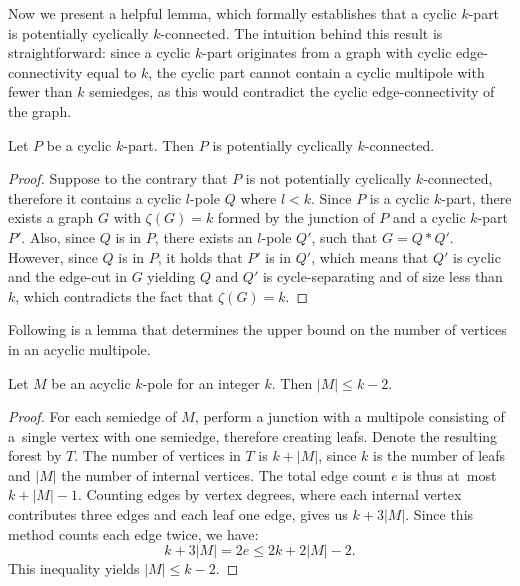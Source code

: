 \documentclass[12pt, twoside]{book}
\begin{document}
Now we present a helpful lemma, which formally establishes that a cyclic $k$-part is potentially cyclically $k$-connected. The intuition behind this result is straightforward: since a cyclic $k$-part originates from a graph with cyclic edge-connectivity equal to $k$, the cyclic part cannot contain a cyclic multipole with fewer than $k$ semiedges, as this would contradict the cyclic edge-connectivity of the graph.

\begin{lemma}\label{lem:cyclic-part-no-small-cyclic-l-pole}
	Let $P$ be a cyclic $k$-part. Then $P$ is potentially cyclically $k$-connected.
\end{lemma}

\begin{proof}
	Suppose to the contrary that $P$ is not potentially cyclically $k$-connected, therefore it contains a cyclic $l$-pole $Q$ where $l<k$. Since $P$ is a cyclic $k$-part, there exists a graph $G$ with $\zeta(G)=k$ formed by the junction of $P$ and a cyclic $k$-part $P'$. Also, since $Q$ is in $P$, there exists an $l$-pole $Q'$, such that $G=Q*Q'$. However, since $Q$ is in $P$, it holds that $P'$ is in $Q'$, which means that $Q'$ is cyclic and the edge-cut in $G$ yielding $Q$ and $Q'$ is cycle-separating and of size less than $k$, which contradicts the fact that $\zeta(G)=k$.
\end{proof}

Following is a lemma that determines the upper bound on the number of vertices in an acyclic multipole.

\begin{lemma}\label{lem:number-of-vertices-in-acyclic-k-pole}
	Let $M$ be an acyclic $k$-pole for an integer $k$. Then $|M|\leq k-2$. 
\end{lemma}

\begin{proof}
	For each semiedge of $M$, perform a junction with a multipole consisting of a~single vertex with one semiedge, therefore creating leafs. Denote the resulting forest by $T$. The number of vertices in $T$ is $k+|M|$, since $k$ is the number of leafs and $|M|$ the number of internal vertices. The total edge count $e$ is thus at~most $k+|M|-1$. Counting edges by vertex degrees, where each internal vertex contributes three edges and each leaf one edge, gives us $k+3|M|$. Since this method counts each edge twice, we have:
	$$k+3|M|=2e\leq 2k+2|M|-2.$$
	This inequality yields $|M|\leq k-2$.
\end{proof}
\end{document}
